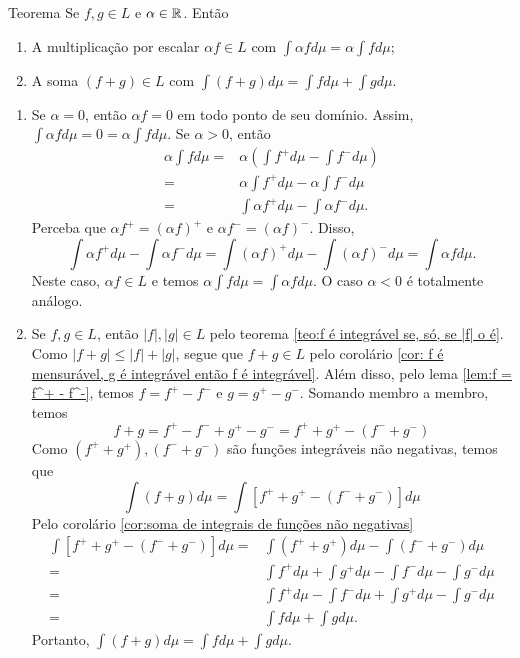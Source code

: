 \begin{env}{Teorema}
	\label{teo: soma e multiplicação por escalar de funções integráveis}
	Se $f, g \in L$ e $\alpha \in \mathbb{R}$. Então
	\begin{enumerate}[label*=(\alph*)]
		\item A multiplicação por escalar $\alpha f \in L$ com $\displaystyle \int \alpha fd\mu = \alpha \int f d\mu$;
		\item A soma $(f + g) \in L$ com $\displaystyle \int (f + g) d\mu = \int f d\mu + \int g d\mu$. 
	\end{enumerate}
\end{env}
\begin{prova}
	\begin{enumerate}[label*=(\alph*)]
	\item Se $\alpha = 0$, então $\alpha f = 0$ em todo ponto de seu domínio.
	Assim,
	$
	\displaystyle\int \alpha f d\mu = 0 = \alpha \int f d\mu.
	$
	Se $\alpha > 0$, então 
	\begin{align*}
		\alpha \int f d\mu
		=&	
		\alpha \left( \int f^+ d\mu - \int f^- d\mu\right)\\
		=&
		\alpha\int f^+ d\mu - \alpha\int f^- d\mu\\
		=&
		\int\alpha f^+ d\mu - \int\alpha f^- d\mu.
	\end{align*}
	Perceba que $\alpha f^+ = (\alpha f)^+$  e $\alpha f^- = (\alpha f)^-$.
	Disso, 
	$$
	\int\alpha f^+ d\mu - \int\alpha f^- d\mu
	=
	\int(\alpha f)^+ d\mu - \int(\alpha f)^- d\mu
	=
	\int \alpha f d\mu.
	$$
	Neste caso, $\alpha f \in L$ e temos $\displaystyle \alpha \int f d\mu = \int \alpha f d\mu$. O caso $\alpha < 0$ é totalmente análogo.
	
	\item Se $f, g \in L$, então $|f|,|g| \in L$ pelo teorema \ref{teo:f é integrável se, só, se |f| o é}.
	Como $|f + g| \leq |f| + |g|$, segue que $f + g \in L$ pelo corolário \ref{cor: f é mensurável, g é integrável então f é integrável}.
	Além disso, pelo lema \ref{lem:f = f^+ - f^-}, temos 
	$f = f^+ - f^-$ e $g = g^+ - g^-$.
	Somando membro a membro, temos
	$$
	f + g = f^+ - f^-  + g^+ - g^- = f^+ + g^+ - (f^- + g^-) 
	$$
	Como $(f^+ + g^+), (f^- + g^-)$ são funções integráveis não negativas, temos que 
	$$
	\int (f + g) d\mu =  \int [f^+ + g^+ - (f^- + g^-)] d\mu 
	$$
	Pelo corolário \ref{cor:soma de integrais de funções não negativas} 
	\begin{align*}
		\int [f^+ + g^+ - (f^- + g^-)] d\mu 
		=&
		\int (f^+ + g^+)d\mu - \int(f^- + g^-) d\mu\\
		=&
		\int f^+ d\mu + \int g^+ d\mu - \int f^-d\mu - \int g^- d\mu\\
		=&
		\int f^+ d\mu - \int f^-d\mu + \int g^+ d\mu  - \int g^- d\mu\\
		=&
		\int f d\mu + \int g d\mu.
	\end{align*}
	Portanto, $\displaystyle \int (f+g)d\mu = \int f d\mu + \int g d\mu.$
	\end{enumerate}
\end{prova}

